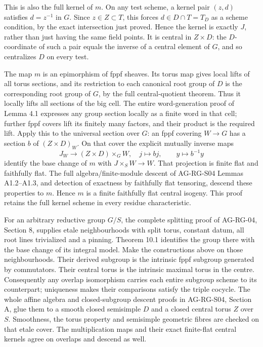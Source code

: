 \documentclass[11pt,a4paper,openany]{report}
\begin{document}
This is also the full kernel of \(m\). On any test scheme, a kernel pair \((z,d)\) satisfies \(d=z^{-1}\) in \(G\). Since \(z\in Z\subset T\), this forces \(d\in D\cap T=T_D\) as a scheme condition, by the exact intersection just proved. Hence the kernel is exactly \(J\), rather than just having the same field points. It is central in \(Z\times D\): the \(D\)-coordinate of such a pair equals the inverse of a central element of \(G\), and so centralizes \(D\) on every test.

The map \(m\) is an epimorphism of fppf sheaves. Its torus map gives local lifts of all torus sections, and its restriction to each canonical root group of \(D\) is the corresponding root group of \(G\), by the full central-quotient theorem. Thus it locally lifts all sections of the big cell. The entire word-generation proof of Lemma 4.1 expresses any group section locally as a finite word in that cell; further fppf covers lift its finitely many factors, and their product is the required lift. Apply this to the universal section over \(G\): an fppf covering \(W\to G\) has a section \(b\) of \((Z\times D)_W\). On that cover the explicit mutually inverse maps \[
 J_W\longrightarrow (Z\times D)\times_GW,\quad j\longmapsto b j,
 \qquad y\longmapsto b^{-1}y
\] identify the base change of \(m\) with \(J\times_SW\to W\). That projection is finite flat and faithfully flat. The full algebra/finite-module descent of AG-RG-S04 Lemmas A1.2--A1.3, and detection of exactness by faithfully flat tensoring, descend these properties to \(m\). Hence \(m\) is a finite faithfully flat central isogeny. This proof retains the full kernel scheme in every residue characteristic.

For an arbitrary reductive group \(G/S\), the complete splitting proof of AG-RG-04, Section 8, supplies etale neighbourhoods with split torus, constant datum, all root lines trivialized and a pinning. Theorem 10.1 identifies the group there with the base change of its integral model. Make the constructions above on those neighbourhoods. Their derived subgroup is the intrinsic fppf subgroup generated by commutators. Their central torus is the intrinsic maximal torus in the centre. Consequently any overlap isomorphism carries each entire subgroup scheme to its counterpart; uniqueness makes their comparisons satisfy the triple cocycle. The whole affine algebra and closed-subgroup descent proofs in AG-RG-S04, Section A, glue them to a smooth closed semisimple \(D\) and a closed central torus \(Z\) over \(S\). Smoothness, the torus property and semisimple geometric fibres are checked on that etale cover. The multiplication maps and their exact finite-flat central kernels agree on overlaps and descend as well.
\end{document}
